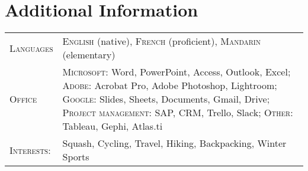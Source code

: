 \documentclass[a4paper,10pt]{article}
\begin{document}
\section{Additional Information}
\begin{supertabular}{p{3.4cm} p{13.9cm}}
	\textsc{Languages}			& \small\textsc{English} (native), \textsc{French} (proficient), \textsc{Mandarin} (elementary) \vspace{1mm} \\

	\textsc{Office}					& \small\textsc{Microsoft}: \footnotesize Word, PowerPoint, Access, Outlook, Excel;	\small\textsc{Adobe}: \footnotesize Acrobat Pro, Adobe Photoshop, Lightroom; \small\textsc{Google}: \footnotesize Slides, Sheets, Documents, Gmail, Drive; \small\textsc{Project management:} \footnotesize SAP, CRM, Trello, Slack; \small\textsc{Other:} \footnotesize Tableau, Gephi, Atlas.ti \vspace{1mm} \\
	\textsc{Interests:} 		& \small Squash, Cycling, Travel, Hiking, Backpacking, Winter Sports \\

\end{supertabular}
\end{document}
